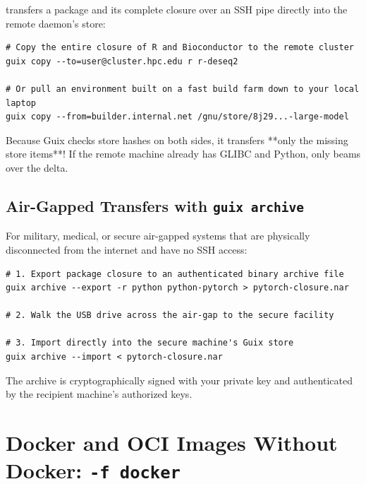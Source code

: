  transfers a package and its complete closure over an SSH pipe directly into the remote daemon's store:

\begin{lstlisting}[style=guixcli]
# Copy the entire closure of R and Bioconductor to the remote cluster
guix copy --to=user@cluster.hpc.edu r r-deseq2

# Or pull an environment built on a fast build farm down to your local laptop
guix copy --from=builder.internal.net /gnu/store/8j29...-large-model
\end{lstlisting}

Because Guix checks store hashes on both sides, it transfers **only the missing store items**! If the remote machine already has GLIBC and Python,  only beams over the delta.

\subsection{Air-Gapped Transfers with \texttt{guix archive}}

For military, medical, or secure air-gapped systems that are physically disconnected from the internet and have no SSH access:

\begin{lstlisting}[style=guixcli]
# 1. Export package closure to an authenticated binary archive file
guix archive --export -r python python-pytorch > pytorch-closure.nar

# 2. Walk the USB drive across the air-gap to the secure facility

# 3. Import directly into the secure machine's Guix store
guix archive --import < pytorch-closure.nar
\end{lstlisting}

The archive is cryptographically signed with your private key and authenticated by the recipient machine's authorized keys.

\section{Docker and OCI Images Without Docker: \texttt{-f docker}}

